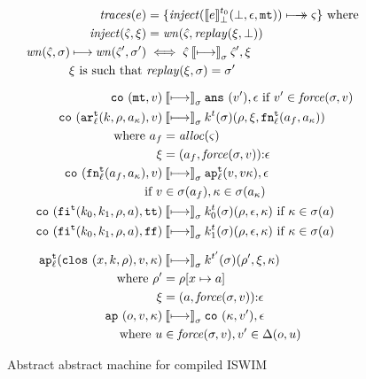 \documentclass[preprint,onecolumn,9pt]{sigplanconf} %
\begin{document}
\begin{figure}
\begin{gather*}
\begin{align*}
\traces(\mexp) &= \setof{ \inject(\compile{\mexp}^\mtcntr_\bot(\bot,\epsilon,\kmt)) \multimachstep \mstate}
                    \text{ where } \\
\inject(\mastate,\msdiff) &= \wn(\mastate,\replay(\msdiff,\bot)) \\
\wn(\mastate,\msto) \machstep \wn(\mastate',\msto') &\iff \mastate \cmachstep_\msto \mastate',\msdiff \\
\msdiff \text{ is such that } &\replay(\msdiff,\msto) = \msto'
\end{align*}
\\[2mm]
\begin{align*}
\co{\kmt,\mval} &\cmachstep_\msto
\ans{\mval'},\epsilon \text{ if } \mval' \in \spchoice{\force(\msto,\mval)}{\force(\mval)}
\\
\co{\kar[^\mcntr_\mlab]{\mcomp,\menv,\maddr_\mkont},\mval} & \cmachstep_\msto
\mcomp^\mcntr(\msto)(\menv,\msdiff,\kfn[^\mcntr_\mlab]{\maddr_f,\maddr_\mkont}) \\
\text{ where } \maddr_f &= \alloc(\mstate) \\
               \msdiff &= \cons{\ttuple{\maddr_f}{\force(\msto,\mval)}}{\epsilon}
\\
\co{\kfn[^\mcntr_\mlab]{\maddr_f,\maddr_\mkont},\mval} & \cmachstep_\msto
\ap[^\mcntr_\mlab]{\mval,\mval\mkont},\epsilon \\
\text{ if }\mval &\in \msto(\maddr_f), \mkont \in \msto(\maddr_\mkont)
\\
\co{\kif[^\mcntr]{\mcompi0,\mcompi1,\menv,\maddr},\strue} & \cmachstep_\msto
\mcompi{0}^\mcntr(\msto)(\menv,\epsilon,\mkont)
\text{ if }\mkont\in\msto(\maddr)
\\
\co{\kif[^\mcntr]{\mcompi0,\mcompi1,\menv,\maddr},\sfalse} & \cmachstep_\msto
\mcompi{1}^\mcntr(\msto)(\menv,\epsilon,\mkont)
\text{ if }\mkont\in\msto(\maddr)
\\[2mm]
\ap[^\mcntr_\mlab]{\clos{\mvar,\mcomp,\menv},\mval,\mkont} & \cmachstep_\msto
\mcomp^{\mcntr'}(\msto)(\menv',\msdiff,\mkont) \\
\text{ where }\menv' &= \menv[\mvar\mapsto\maddr] \\
              \msdiff &= \cons{\ttuple{\maddr}{\force(\msto,\mval)}}{\epsilon}
\\
\ap{\mop,\mval,\mkont} & \cmachstep_\msto
\co{\mkont,\mval'},\epsilon \\
\text{ where } \mvalx{u} &\in \spchoice{\force(\msto,\mval)}{\force(\mval)}, \mval'\in\interpdelta(\mop,\mvalx{u})
\end{align*}
\end{gather*}
\caption{Abstract abstract machine for compiled ISWIM}
\label{fig:caam}
\end{figure}
\end{document}
